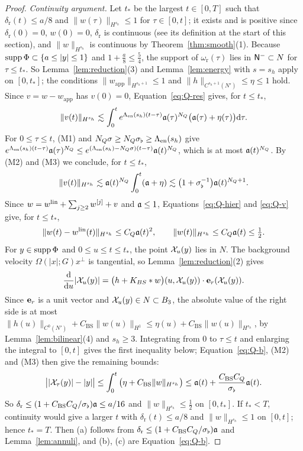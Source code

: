 \begin{proof}
\emph{Continuity argument.} Let $t_*$ be the largest $t\in[0,T]$ such that
$\delta_{\mathrm r}(t)\le a/8$ and $\|w(\tau)\|_{H^{s_h}}\le1$ for $\tau\in[0,t]$; it
exists and is positive since $\delta_{\mathrm r}(0)=0$, $w(0)=0$, $\delta_{\mathrm r}$
is continuous (see its definition at the start of this section), and
$\|w\|_{H^{s_h}}$ is continuous by Theorem~\ref{thm:smooth}\textup{(1)}. Because $\operatorname{supp}\Phi\subset\{a\le|y|\le1\}$ and
$1+\frac a8\le\frac54$, the support of $\omega_{\mathrm r}(\tau)$ lies in
$\mathsf{N}^{-}\subset N$ for $\tau\le t_*$. So Lemma~\ref{lem:reduction}\textup{(3)} and
Lemma~\ref{lem:energy} with $s=s_h$ apply on $[0,t_*]$; the conditions
$\|w_{\mathrm{app}}\|_{H^{s_h+1}}\le1$ and $\|h\|_{C^{s_h+1}(N')}\le\eta\le1$ hold.
Since $v=w-w_{\mathrm{app}}$ has $v(0)=0$, Equation~\eqref{eq:Q-res} gives, for
$t\le t_*$,
\[
\|v(t)\|_{H^{s_h}}\lesssim\int_0^te^{\Lambda_{\mathrm{en}}(s_h)(t-\tau)}\mathfrak{a}(\tau)^{N_Q}\big(\mathfrak{a}(\tau)+\eta(\tau)\big)\dd\tau .
\]
For $0\le\tau\le t$, (M1) and $N_Q\sigma\ge N_Q\sigma_\flat\ge\Lambda_{\mathrm{en}}(s_h)$ give
$e^{\Lambda_{\mathrm{en}}(s_h)(t-\tau)}\mathfrak{a}(\tau)^{N_Q}\le e^{(\Lambda_{\mathrm{en}}(s_h)-N_Q\sigma)(t-\tau)}\mathfrak{a}(t)^{N_Q}$,
which is at most $\mathfrak{a}(t)^{N_Q}$. By (M2) and (M3) we conclude, for $t\le t_*$,
\begin{equation}
\label{eq:Q-v}
\|v(t)\|_{H^{s_h}}\lesssim\mathfrak{a}(t)^{N_Q}\int_0^t(\mathfrak{a}+\eta)\lesssim\big(1+\sigma_\flat^{-1}\big)\mathfrak{a}(t)^{N_Q+1}.
\end{equation}
Since $w=w^{\mathrm{lin}}+\sum_{j\ge2}w^{[j]}+v$ and $\mathfrak{a}\le1$, Equations~\eqref{eq:Q-hier}
and \eqref{eq:Q-v} give, for $t\le t_*$,
\begin{equation}
\label{eq:Q-b}
\|w(t)-w^{\mathrm{lin}}(t)\|_{H^{s_h}}\le C_Q\mathfrak{a}(t)^2,\qquad\|w(t)\|_{H^{s_h}}\le C_Q\mathfrak{a}(t)\le\tfrac12 .
\end{equation}
For $y\in\operatorname{supp}\Phi$ and $0\le u\le t\le t_*$, the point $\mathcal{X}_u(y)$ lies in $N$.
The background velocity $\Omega(|x|;G)x^\perp$ is tangential, so
Lemma~\ref{lem:reduction}\textup{(2)} gives
\[
\frac{\dd}{\dd u}|\mathcal{X}_u(y)|
=\big(h+K_{BS}\ast w\big)(u,\mathcal{X}_u(y))\cdot\textbf{e}_r(\mathcal{X}_u(y)).
\]
Since $\textbf{e}_r$ is a unit vector and $\mathcal{X}_u(y)\in N\subset B_3$, the absolute
value of the right side is at most
$\|h(u)\|_{C^0(N')}+C_{\mathrm{BS}}\|w(u)\|_{H^1}
\le\eta(u)+C_{\mathrm{BS}}\|w(u)\|_{H^{s_h}}$,
by Lemma~\ref{lem:bilinear}\textup{(4)} and $s_h\ge3$.
Integrating from $0$ to $\tau\le t$ and enlarging the integral to $[0,t]$
gives the first inequality below; Equation~\eqref{eq:Q-b}, (M2) and (M3)
then give the remaining bounds:
\[
\big||\mathcal{X}_\tau(y)|-|y|\big|\le\int_0^t\big(\eta+C_{\mathrm{BS}}\|w\|_{H^{s_h}}\big)\le\mathfrak{a}(t)+\frac{C_{\mathrm{BS}}C_Q}{\sigma_\flat}\mathfrak{a}(t).
\]
So $\delta_{\mathrm r}\le(1+C_{\mathrm{BS}}C_Q/\sigma_\flat)\mathfrak{a}\le a/16$ and $\|w\|_{H^{s_h}}\le\frac12$ on
$[0,t_*]$. If $t_*<T$, continuity would give a larger $t$ with
$\delta_{\mathrm r}(t)\le a/8$ and $\|w\|_{H^{s_h}}\le1$ on $[0,t]$; hence $t_*=T$.
Then (a) follows from $\delta_{\mathrm r}\le(1+C_{\mathrm{BS}}C_Q/\sigma_\flat)\mathfrak{a}$ and Lemma~\ref{lem:annuli},
and (b), (c) are
Equation~\eqref{eq:Q-b}.
\end{proof}

